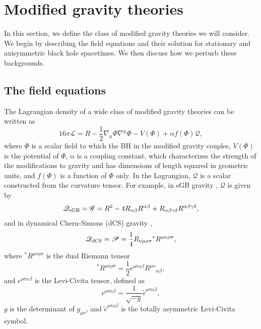 \documentclass[aps,prx,amsmath,floats,floatfix,twocolumn,
  superscriptaddress,nofootinbib,showpacs]{revtex4-1}
\begin{document}
\section{Modified gravity theories}
\label{sec:MGTs}

In this section, we define the class of modified gravity theories we will consider. We begin by describing the field equations and their solution for stationary and axisymmetric black hole spacetimes. We then discuss how we perturb these backgrounds.  
\subsection{The field equations}
\label{sec:FEs}

The Lagrangian density of a wide class of modified gravity theories can be written as \cite{Yagi:2015oca, Nair:2019iur, Perkins:2021mhb}
\begin{equation}\label{eq:Lagrangian}
16 \pi \mathscr{L} = R - \frac{1}{2} \nabla_{\mu} \Phi \nabla^{\mu} \Phi- V(\Phi) + \alpha f(\Phi) \mathscr{Q}, 
\end{equation}
where $\Phi$ is a scalar field to which the BH in the modified gravity couples, $V(\Phi)$ is the potential of $\Phi$, $\alpha$ is a coupling constant, which characterizes the strength of the modifications to gravity and has dimensions of length squared in geometric units, and $f(\Phi)$ is a function of $\Phi$ only. 
In the Lagrangian, $\mathscr{Q}$ is a scalar constructed from the curvature tensor. 
For example, in sGB gravity \cite{Ripley:2019irj, Cano_Ruiperez_2019}, $\mathscr{Q}$ is given by 
\begin{equation}
\mathscr{Q}_{\rm sGB} = \mathscr{G} = R^2 - 4 R_{\alpha \beta} R^{\alpha \beta} + R_{\alpha \beta \gamma \delta} R^{\alpha \beta \gamma \delta}, 
\end{equation}
and in dynamical Chern-Simons (dCS) gravity \cite{dCS_01, dCS_02, dCS_03}, 
\begin{equation}
\mathscr{Q}_{\rm dCS} = \mathscr{P} = \frac{1}{4} R_{\nu \mu \rho \sigma}{ }^* R^{\mu \nu \rho \sigma}, 
\end{equation}
where ${}^* R^{\mu \nu \rho \sigma}$ is the dual Riemann tensor
\begin{equation}
{}^* R^{\mu \nu \rho \sigma} = \frac{1}{2} \epsilon^{\rho \sigma \alpha \beta} R^{\mu \nu} {}_{\alpha \beta}, 
\end{equation}
and $\epsilon^{\rho \sigma \alpha \beta}$ is the Levi-Civita tensor, defined as 
\begin{equation}
\epsilon^{\rho \sigma \alpha \beta} = \frac{1}{\sqrt{-g}} \tilde{\epsilon}^{\rho \sigma \alpha \beta}, 
\end{equation}
$g$ is the determinant of $g_{\mu \nu}$, and $\tilde{\epsilon}^{\rho \sigma \alpha \beta}$ is the totally asymmetric Levi-Civita symbol. 
\end{document}
